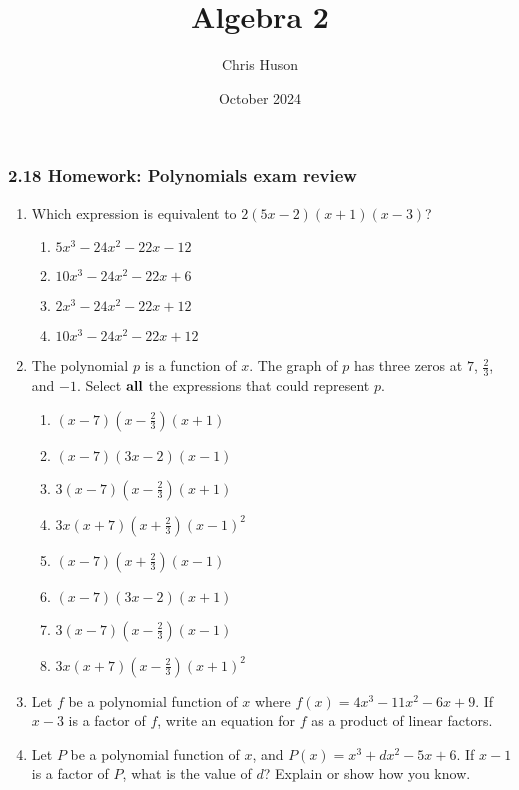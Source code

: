 \documentclass[12pt, twoside]{article}
\title{Algebra 2}
\author{Chris Huson}
\date{October 2024}
\begin{document}
\subsubsection*{2.18 Homework: Polynomials exam review}
\begin{enumerate}
\item Which expression is equivalent to $2(5x-2)(x+1)(x-3)$? \vspace{0.25cm}
    \begin{enumerate}
        \item $5x^3-24x^2-22x-12$ 
        \item $10x^3-24x^2-22x+6$ 
        \item $2x^3-24x^2-22x+12$ 
        \item $10x^3-24x^2-22x+12$ 
    \end{enumerate} \vspace{0.5cm}

\item The polynomial $p$ is a function of $x$. The graph of $p$ has three zeros at $7$, $\frac{2}{3}$, and $-1$. Select $\bf{all}$ the expressions that could represent $p$. \vspace{0.25cm}
    \begin{multicols}{2}
    \begin{enumerate}
        \item $(x-7)(x-\frac{2}{3})(x+1)$
        \item $(x-7)(3x-2)(x-1)$
        \item $3(x-7)(x-\frac{2}{3})(x+1)$
        \item $3x(x+7)(x+\frac{2}{3})(x-1)^2$
        \item $(x-7)(x+\frac{2}{3})(x-1)$
        \item $(x-7)(3x-2)(x+1)$
        \item $3(x-7)(x-\frac{2}{3})(x-1)$
        \item $3x(x+7)(x-\frac{2}{3})(x+1)^2$
    \end{enumerate}
    \end{multicols}
        \vspace{0.5cm}

\item Let $f$ be a polynomial function of $x$ where $f(x)=4x^3-11x^2-6x+9$. If $x-3$ is a factor of $f$, write an equation for $f$ as a product of linear factors.
\vspace{5cm}

\newpage
\item Let $P$ be a polynomial function of $x$, and $P(x)=x^3+dx^2-5x+6$. If $x-1$ is a factor of $P$, what is the value of $d$? Explain or show how you know.
\vspace{6cm}


\end{enumerate}
\end{document}

